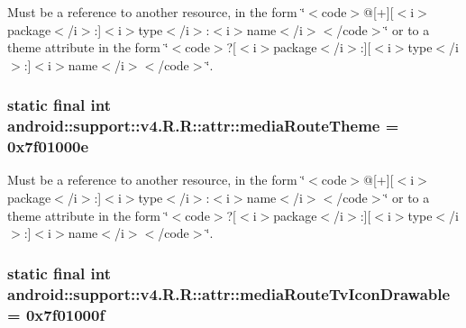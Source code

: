Must be a reference to another resource, in the form \char`\"{}$<$code$>$@\mbox{[}+\mbox{]}\mbox{[}$<$i$>$package$<$/i$>$:\mbox{]}$<$i$>$type$<$/i$>$:$<$i$>$name$<$/i$>$$<$/code$>$\char`\"{} or to a theme attribute in the form \char`\"{}$<$code$>$?\mbox{[}$<$i$>$package$<$/i$>$:\mbox{]}\mbox{[}$<$i$>$type$<$/i$>$:\mbox{]}$<$i$>$name$<$/i$>$$<$/code$>$\char`\"{}. \hypertarget{classandroid_1_1support_1_1v4_1_1_r_1_1attr_feacb3f6132d8e12f9a50b46709bbc70}{
\subsubsection[{mediaRouteTheme}]{\setlength{\rightskip}{0pt plus 5cm}static final int android::support::v4.R.R::attr::mediaRouteTheme = 0x7f01000e}}
\label{classandroid_1_1support_1_1v4_1_1_r_1_1attr_feacb3f6132d8e12f9a50b46709bbc70}


Must be a reference to another resource, in the form \char`\"{}$<$code$>$@\mbox{[}+\mbox{]}\mbox{[}$<$i$>$package$<$/i$>$:\mbox{]}$<$i$>$type$<$/i$>$:$<$i$>$name$<$/i$>$$<$/code$>$\char`\"{} or to a theme attribute in the form \char`\"{}$<$code$>$?\mbox{[}$<$i$>$package$<$/i$>$:\mbox{]}\mbox{[}$<$i$>$type$<$/i$>$:\mbox{]}$<$i$>$name$<$/i$>$$<$/code$>$\char`\"{}. \hypertarget{classandroid_1_1support_1_1v4_1_1_r_1_1attr_264691dfe48db9ee911b2c61a5e7cd8c}{
\subsubsection[{mediaRouteTvIconDrawable}]{\setlength{\rightskip}{0pt plus 5cm}static final int android::support::v4.R.R::attr::mediaRouteTvIconDrawable = 0x7f01000f}}
\label{classandroid_1_1support_1_1v4_1_1_r_1_1attr_264691dfe48db9ee911b2c61a5e7cd8c}


